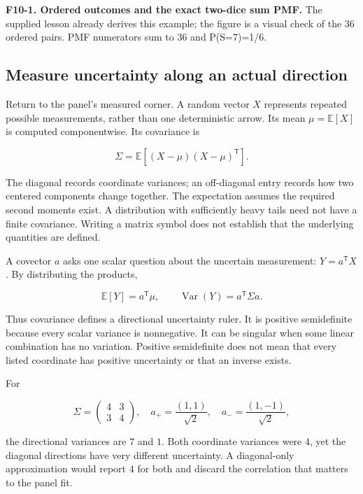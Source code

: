 \textbf{F10-1. Ordered outcomes and the exact two-dice sum PMF.} The supplied lesson already derives this example; the figure is a visual check of the 36 ordered pairs. PMF numerators sum to 36 and P(S=7)=1/6.

\subsection{Measure uncertainty along an actual direction}\label{02-foundations-ii-ch023-measure-uncertainty-along-an-actual-direction}

Return to the panel's measured corner. A random vector \(X\) represents repeated possible measurements, rather than one deterministic arrow. Its mean \(\mu=\mathbb E[X]\) is computed componentwise. Its covariance is

\[
\Sigma=\mathbb E[(X-\mu)(X-\mu)^{\mathsf T}].
\]

The diagonal records coordinate variances; an off-diagonal entry records how two centered components change together. The expectation assumes the required second moments exist. A distribution with sufficiently heavy tails need not have a finite covariance. Writing a matrix symbol does not establish that the underlying quantities are defined.

A covector \(a\) asks one scalar question about the uncertain measurement: \(Y=a^{\mathsf T}X\). By distributing the products,

\[
\mathbb E[Y]=a^{\mathsf T}\mu,\qquad
\operatorname{Var}(Y)=a^{\mathsf T}\Sigma a.
\]

Thus covariance defines a directional uncertainty ruler. It is positive semidefinite because every scalar variance is nonnegative. It can be singular when some linear combination has no variation. Positive semidefinite does not mean that every listed coordinate has positive uncertainty or that an inverse exists.

For

\[
\Sigma=\begin{pmatrix}4&3\\3&4\end{pmatrix},
\quad a_+=\frac{(1,1)}{\sqrt2},\quad
a_-=\frac{(1,-1)}{\sqrt2},
\]

the directional variances are \(7\) and \(1\). Both coordinate variances were \(4\), yet the diagonal directions have very different uncertainty. A diagonal-only approximation would report \(4\) for both and discard the correlation that matters to the panel fit.

